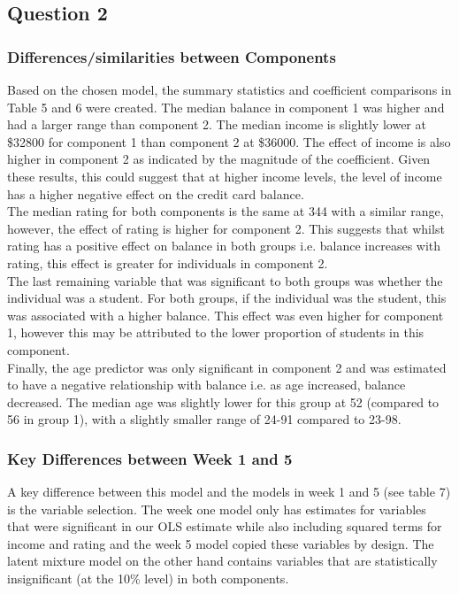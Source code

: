 \documentclass[12pt]{article}
\begin{document}
{\subsection*{Question 2}
\subsubsection*{Differences/similarities between Components}

Based on the chosen model, the summary statistics and coefficient comparisons in Table 5 and 6 were created. The median balance in component 1 was higher and had a larger range than component 2. The median income is slightly lower at \$32800 for component 1 than component 2 at \$36000. The effect of income is also higher in component 2 as indicated by the magnitude of the coefficient. Given these results, this could suggest that at higher income levels, the level of income has a higher negative effect on the credit card balance.\\

The median rating for both components is the same at 344 with a similar range, however, the effect of rating is higher for component 2. This suggests that whilst rating has a positive effect on balance in both groups i.e. balance increases with rating, this effect is greater for individuals in component 2.\\

The last remaining variable that was significant to both groups was whether the individual was a student. For both groups, if the individual was the student, this was associated with a higher balance. This effect was even higher for component 1, however this may be attributed to the lower proportion of students in this component.\\

Finally, the age predictor was only significant in component 2 and was estimated to have a negative relationship with balance i.e. as age increased, balance decreased. The median age was slightly lower for this group at 52 (compared to 56 in group 1), with a slightly smaller range of 24-91 compared to 23-98.\\


\subsubsection*{Key Differences between Week 1 and 5}
A key difference between this model and the models in week 1 and 5 (see table 7) is the variable selection. The week one model only has estimates for variables that were significant in our OLS estimate while also including squared terms for income and rating and the week 5 model copied these variables by design. The latent mixture model on the other hand contains variables that are statistically insignificant (at the 10\% level) in both components.\\

}
\end{document}
